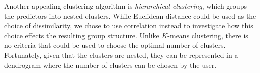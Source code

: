 \documentclass[11pt]{article}
\begin{document}
Another appealing clustering algorithm is \textit{hierarchical clustering}, which groups the predictors into nested clusters. While Euclidean distance could be used as the choice of dissimilarity, we chose to use correlation instead to investigate how this choice effects the resulting group structure. Unlike $K$-means clustering, there is no criteria that could be used to choose the optimal number of clusters. Fortunately, given that the clusters are nested, they can be represented in a dendrogram where the number of clusters can be chosen by the user. 













\end{document}

